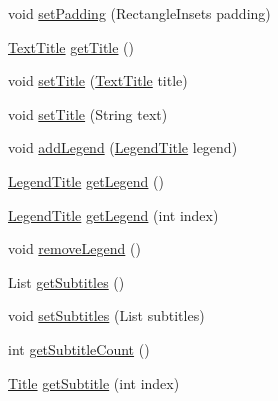 \begin{DoxyCompactItemize}
\item 
void \mbox{\hyperlink{classorg_1_1jfree_1_1chart_1_1_j_free_chart_a978fccb7d5dc20a6754a9045f61d5b11}{set\+Padding}} (Rectangle\+Insets padding)
\item 
\mbox{\hyperlink{classorg_1_1jfree_1_1chart_1_1title_1_1_text_title}{Text\+Title}} \mbox{\hyperlink{classorg_1_1jfree_1_1chart_1_1_j_free_chart_a4874b3d8f2ebef141b31764ff698fa05}{get\+Title}} ()
\item 
void \mbox{\hyperlink{classorg_1_1jfree_1_1chart_1_1_j_free_chart_a45064dfb45c9c2a7e6d2ebb8e71be884}{set\+Title}} (\mbox{\hyperlink{classorg_1_1jfree_1_1chart_1_1title_1_1_text_title}{Text\+Title}} title)
\item 
void \mbox{\hyperlink{classorg_1_1jfree_1_1chart_1_1_j_free_chart_a69d0680abdcd52c2e9967496284bdae6}{set\+Title}} (String text)
\item 
void \mbox{\hyperlink{classorg_1_1jfree_1_1chart_1_1_j_free_chart_ae44c0da2bbdccd9921a15df955f7c20b}{add\+Legend}} (\mbox{\hyperlink{classorg_1_1jfree_1_1chart_1_1title_1_1_legend_title}{Legend\+Title}} legend)
\item 
\mbox{\hyperlink{classorg_1_1jfree_1_1chart_1_1title_1_1_legend_title}{Legend\+Title}} \mbox{\hyperlink{classorg_1_1jfree_1_1chart_1_1_j_free_chart_a761aca9a3ee1c8198e055aa03c77a980}{get\+Legend}} ()
\item 
\mbox{\hyperlink{classorg_1_1jfree_1_1chart_1_1title_1_1_legend_title}{Legend\+Title}} \mbox{\hyperlink{classorg_1_1jfree_1_1chart_1_1_j_free_chart_a9ebd675579af1cd17f65d6bbfa274aac}{get\+Legend}} (int index)
\item 
void \mbox{\hyperlink{classorg_1_1jfree_1_1chart_1_1_j_free_chart_acde6bda611f15c2f55255a42280b5fd9}{remove\+Legend}} ()
\item 
List \mbox{\hyperlink{classorg_1_1jfree_1_1chart_1_1_j_free_chart_ae2ec05a9cb012173d7982409ee9b8c6b}{get\+Subtitles}} ()
\item 
void \mbox{\hyperlink{classorg_1_1jfree_1_1chart_1_1_j_free_chart_a8ead70270292a750391e3deec8a78d4f}{set\+Subtitles}} (List subtitles)
\item 
int \mbox{\hyperlink{classorg_1_1jfree_1_1chart_1_1_j_free_chart_aea3529a3eb5a3c86a1bf60238bbbfd41}{get\+Subtitle\+Count}} ()
\item 
\mbox{\hyperlink{classorg_1_1jfree_1_1chart_1_1title_1_1_title}{Title}} \mbox{\hyperlink{classorg_1_1jfree_1_1chart_1_1_j_free_chart_a4eb1ebe0bedff91b3343cf1a71ecbade}{get\+Subtitle}} (int index)
\item 

\end{DoxyCompactItemize}
